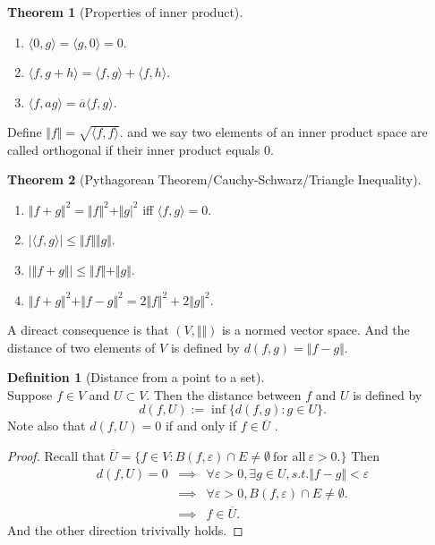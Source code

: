 \documentclass[12pt]{book}
\theoremstyle{definition}
\newtheorem{definition}{Definition}[chapter]
\newtheorem{theorem}{Theorem}[chapter]
\newcommand{\inner}[2]{{\langle #1,#2\rangle}}
\begin{document}
\begin{theorem}[Properties of inner product] \ 
	\begin{enumerate}
		\item $\inner{0}{g} = \inner{g}{0}=0$.
		\item $\inner{f}{g+h}=\inner{f}{g}+\inner{f}{h}$.
		\item $\inner{f}{ag}=\overline{a}\inner{f}{g}.$
	\end{enumerate}
\end{theorem}
Define $\Vert f\Vert = \sqrt{\inner{f}{f}}$. and we say two elements of an inner product space are called orthogonal if their inner product equals 0.
\begin{theorem}[Pythagorean Theorem/Cauchy-Schwarz/Triangle Inequality]\
\begin{enumerate}
	\item $\Vert f+g \Vert^2=\Vert f\Vert^2 + \Vert g \vert^2$ iff $\inner{f}{g}=0$.
	\item $|\inner{f}{g}|\leq \Vert f \Vert \Vert g \Vert$. 
	\item $|\Vert f+g \Vert |\leq \Vert f\Vert + \Vert g \Vert$.
	\item $\Vert f+g \Vert^2+\Vert f-g \Vert^2=2\Vert f\Vert^2 + 2\Vert g \Vert^2$.   
\end{enumerate}
\end{theorem}
A direact consequence is that $(V,\Vert \Vert)$ is a normed vector space. And the distance of two elements of $V$ is defined by $d(f,g)=\Vert f-g\Vert$. 

\begin{definition}[Distance from a point to a set] \ \\
Suppose $f\in V$ and $U \subset V$. Then the distance between $f$ and $U$ is defined by
$$
d(f,U) := \inf\{d(f,g): g\in U \}. 
$$
Note also that $d(f,U)=0$ if and only if $f\in \overline{U}$	.
\end{definition}
\begin{proof} Recall that $\overline U =\{f\in V: B(f,\varepsilon)\cap E \neq \emptyset \ \text{for all} \ \varepsilon >0.\}$
Then
\begin{eqnarray*}
	d(f,U)=0 &\implies & \forall \varepsilon >0 ,\exists g\in U, s.t. \Vert f-g\Vert < \varepsilon \\
	& \implies & \forall \varepsilon >0, B(f,\varepsilon)\cap E\neq \emptyset. \\
	& \implies & f \in \overline U.
\end{eqnarray*}
And the other direction trivivally holds. 
\end{proof}
\end{document}
